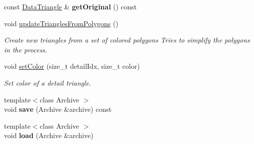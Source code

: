 \begin{DoxyCompactItemize}
\item 
\mbox{\label{classpepr3d_1_1_triangle_detail_ac206277a3049356735f0f8f3294ad3a8}} 
const \mbox{\hyperlink{classpepr3d_1_1_data_triangle}{Data\+Triangle}} \& {\bfseries get\+Original} () const
\item 
\mbox{\label{classpepr3d_1_1_triangle_detail_a55836364f8bca5dce29da4a7320adf65}} 
void \mbox{\hyperlink{classpepr3d_1_1_triangle_detail_a55836364f8bca5dce29da4a7320adf65}{update\+Triangles\+From\+Polygons}} ()
\begin{DoxyCompactList}\small\item\em Create new triangles from a set of colored polygons Tries to simplify the polygons in the process. \end{DoxyCompactList}\item 
\mbox{\label{classpepr3d_1_1_triangle_detail_ab27f8b435c7c88f80eb35caac5ae9d34}} 
void \mbox{\hyperlink{classpepr3d_1_1_triangle_detail_ab27f8b435c7c88f80eb35caac5ae9d34}{set\+Color}} (size\+\_\+t detail\+Idx, size\+\_\+t color)
\begin{DoxyCompactList}\small\item\em Set color of a detail triangle. \end{DoxyCompactList}\item 
\mbox{\label{classpepr3d_1_1_triangle_detail_af671c482070226f504855f702e1cf9ac}} 
{\footnotesize template$<$class Archive $>$ }\\void {\bfseries save} (Archive \&archive) const
\item 
\mbox{\label{classpepr3d_1_1_triangle_detail_acad2f44169bb8872522e60d11f54fe86}} 
{\footnotesize template$<$class Archive $>$ }\\void {\bfseries load} (Archive \&archive)
\end{DoxyCompactItemize}
